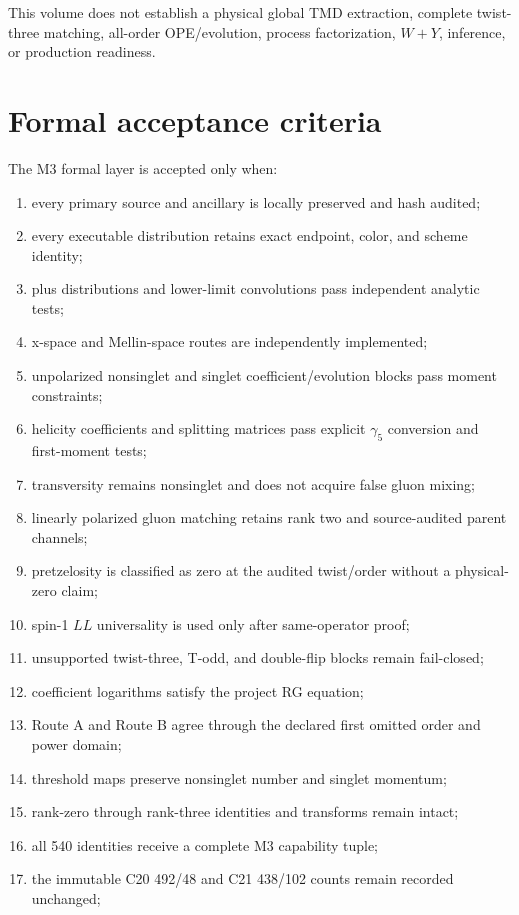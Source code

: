 \documentclass[11pt]{article}
\begin{document}
This volume does not establish a physical global TMD extraction, complete twist-three matching, all-order OPE/evolution, process factorization, \(W+Y\), inference, or production readiness.

\section{Formal acceptance criteria}
\label{sec:acceptance}

The M3 formal layer is accepted only when:
\begin{enumerate}
\item every primary source and ancillary is locally preserved and hash audited;
\item every executable distribution retains exact endpoint, color, and scheme identity;
\item plus distributions and lower-limit convolutions pass independent analytic tests;
\item x-space and Mellin-space routes are independently implemented;
\item unpolarized nonsinglet and singlet coefficient/evolution blocks pass moment constraints;
\item helicity coefficients and splitting matrices pass explicit \(\gamma_5\) conversion and first-moment tests;
\item transversity remains nonsinglet and does not acquire false gluon mixing;
\item linearly polarized gluon matching retains rank two and source-audited parent channels;
\item pretzelosity is classified as zero at the audited twist/order without a physical-zero claim;
\item spin-1 \(LL\) universality is used only after same-operator proof;
\item unsupported twist-three, T-odd, and double-flip blocks remain fail-closed;
\item coefficient logarithms satisfy the project RG equation;
\item Route A and Route B agree through the declared first omitted order and power domain;
\item threshold maps preserve nonsinglet number and singlet momentum;
\item rank-zero through rank-three identities and transforms remain intact;
\item all 540 identities receive a complete M3 capability tuple;
\item the immutable C20 492/48 and C21 438/102 counts remain recorded unchanged;

\end{enumerate}
\end{document}
